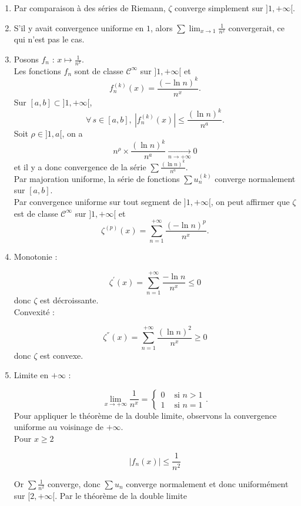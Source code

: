 \begin{enumerate}
\item Par comparaison à des séries de Riemann, $\zeta$ converge simplement sur 
$]1,+\infty[$.
\item S'il y avait convergence uniforme en $1$, alors 
$\displaystyle\sum\displaystyle\lim_{x\to1}\displaystyle\frac1{n^x}$ convergerait, 
ce qui n'est pas le cas.
\item Posons $f_n$ : $x\mapsto \displaystyle\frac1{n^x}$.\\
Les fonctions $f_n$ sont de classe $\mathscr{C}^{\infty}$ sur $] 1,+\infty[$ et
$$
f_n^{(k)}(x)=\displaystyle\frac{(-\ln n)^k}{n^x}.
$$
Sur $[a, b] \subset] 1,+\infty[$,
$$
\forall\, s \in[a, b],\ \left|f_n^{(k)}(x)\right| \leqslant \dfrac{(\ln n)^k}{n^a}.
$$
Soit $\rho \in]1, a[$, on a
$$
n^\rho \times \displaystyle\frac{(\ln n)^k}{n^a} 
\underset{n\to +\infty}\longrightarrow 0
$$
et il y a donc convergence de la série $\displaystyle\sum 
\displaystyle\frac{(\ln n)^k}{n^a}$.\\
Par majoration uniforme, la série de fonctions $\displaystyle\sum u_n^{(k)}$ converge 
normalement sur $[a, b]$.\\
Par convergence uniforme sur tout segment de $] 1,+\infty[$, 
on peut affirmer que $\zeta$ est de classe $\mathscr{C}^{\infty}$ sur $] 1,+\infty[$ et
$$
\zeta^{(p)}(x)=\displaystyle\sum_{n=1}^{+\infty} \displaystyle\frac{(-\ln n)^p}{n^x}.
$$
\item Monotonie :

$$
\zeta^{\prime}(x)=\displaystyle\sum_{n=1}^{+\infty} \displaystyle\frac{-\ln n}{n^x} 
\leqslant 0
$$
donc $\zeta$ est décroissante.\\
Convexité :

$$
\zeta^{''}(x)=\sum_{n=1}^{+\infty} \displaystyle\frac{(\ln n)^2}{n^x} \geqslant 0
$$
donc $\zeta$ est convexe.
\item Limite en $+\infty$ :

$$
\displaystyle\lim _{x \rightarrow+\infty} \displaystyle\frac{1}{n^x}= 
\begin{cases}0 & \text { si } n>1 \\ 1 & \text { si } n=1\end{cases}.
$$
Pour appliquer le théorème de la double limite, observons la convergence uniforme au
voisinage de $+\infty$.\\
Pour $x \geqslant 2$

$$
\left|f_n(x)\right| \leqslant \displaystyle\frac{1}{n^2}
$$


Or $\displaystyle\sum \displaystyle\frac{1}{n^2}$ converge, donc
$\displaystyle\sum u_n$ converge normalement et donc uniformément sur $[2,+\infty[$.
Par le théorème de la double limite


\end{enumerate}
